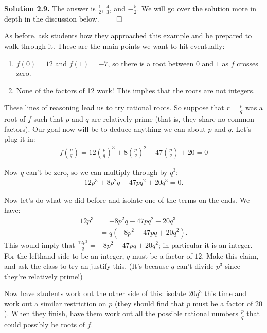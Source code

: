 \textbf{Solution 2.9.} The answer is $\frac12$, $\frac43$, and $-\frac52$. We will go over the solution more in depth in the discussion below. \hspace{\fill} $\qed$

As before, ask students how they approached this example and be prepared to walk through it. These are the main points we want to hit eventually:

\begin{enumerate}
    \item $f(0) = 12$ and $f(1) = -7$, so there is a root between $0$ and $1$ as $f$ crosses zero.
    \item None of the factors of 12 work! This implies that the roots are not integers.
\end{enumerate}

These lines of reasoning lead us to try rational roots. So suppose that $r = \frac{p}{q}$ was a root of $f$ such that $p$ and $q$ are relatively prime (that is, they share no common factors). Our goal now will be to deduce anything we can about $p$ and $q$. Let's plug it in:
\begin{align*}
    f\left(\frac{p}{q}\right) = 12\left(\frac{p}{q}\right)^3 + 8\left(\frac{p}{q}\right)^2 - 47\left(\frac{p}{q}\right) + 20 = 0
\end{align*}

Now $q$ can't be zero, so we can multiply through by $q^3$:
\begin{align*}
    12p^3 + 8p^2q - 47pq^2 + 20q^3 = 0.
\end{align*}

Now let's do what we did before and isolate one of the terms on the ends. We have:
\begin{align*}
    12p^3 &= -8p^2q - 47pq^2 + 20q^3\\
        &= q(-8p^2-47pq+20q^2).
\end{align*}
This would imply that $\frac{12p^3}{q} = -8p^2-47pq + 20q^2$; in particular it is an integer. For the lefthand side to be an integer, $q$ must be a factor of $12$. Make this claim, and ask the class to try an justify this. (It's because $q$ can't divide $p^3$ since they're relatively prime!)

Now have students work out the other side of this: isolate $20q^3$ this time and work out a similar restriction on $p$ (they should find that $p$ must be a factor of $20$). When they finish, have them work out all the possible rational numbers $\frac{p}{q}$ that could possibly be roots of $f$.

